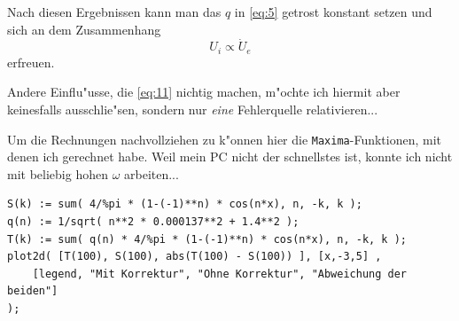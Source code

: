 \documentclass[a4paper,12pt]{article}
\newcommand{\abs}[0]{\bigskip\noindent}
\begin{document}
\abs
Nach diesen Ergebnissen kann man das $q$ in \eqref{eq:5} getrost
konstant setzen und sich an dem Zusammenhang
\begin{equation}
  \label{eq:11}
  U_i \propto \dot U_e 
\end{equation}
erfreuen.

Andere Einflu"usse, die \eqref{eq:11} nichtig machen, m"ochte ich
hiermit aber keinesfalls ausschlie"sen, sondern nur \emph{eine}
Fehlerquelle relativieren...


\abs
Um die Rechnungen nachvollziehen zu k"onnen hier die
\texttt{Maxima}-Funktionen, mit denen ich gerechnet habe. Weil mein PC
nicht der schnellstes ist, konnte ich nicht mit beliebig hohen
$\omega$ arbeiten...

\begin{verbatim}
S(k) := sum( 4/%pi * (1-(-1)**n) * cos(n*x), n, -k, k );
q(n) := 1/sqrt( n**2 * 0.000137**2 + 1.4**2 );
T(k) := sum( q(n) * 4/%pi * (1-(-1)**n) * cos(n*x), n, -k, k );
plot2d( [T(100), S(100), abs(T(100) - S(100)) ], [x,-3,5] , 
    [legend, "Mit Korrektur", "Ohne Korrektur", "Abweichung der beiden"] 
);
\end{verbatim}
 
 
 
 
 
 
\end{document}

